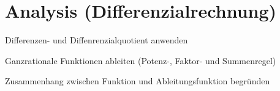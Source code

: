 \documentclass[
    ngerman,
    color=1b,
    load_common,
    leqno,
    dark_mode,
    boxarc,
    solution=true,
]{rubos-tuda-template}
\begin{document}
\section*{Analysis (Differenzialrechnung)}
\begin{task}[points=1]{Differenzen- und Diffenrenzialquotient anwenden}

\end{task}
\begin{task}[points=1]{Ganzrationale Funktionen ableiten (Potenz-, Faktor- und Summenregel)}

\end{task}
\clearpage
\begin{task}[points=6]{Zusammenhang zwischen Funktion und Ableitungsfunktion begründen}
    \def\coordinatesystemradius{4}




\end{task}
\end{document}

